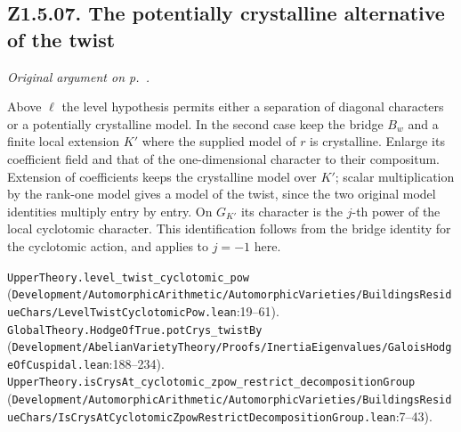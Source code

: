 \subsection{Z1.5.07. The potentially crystalline alternative of the twist}\label{r6:review:Z1.5.07} \emph{Original argument on p.~\pageref{r5:small:Z1.5.07}.} 

Above $\ell$ the level hypothesis permits either a separation of diagonal characters or a potentially crystalline model. In the second case keep the bridge $B_w$ and a finite local extension $K'$ where the supplied model of $r$ is crystalline. Enlarge its coefficient field and that of the one-dimensional character to their compositum. Extension of coefficients keeps the crystalline model over $K'$; scalar multiplication by the rank-one model gives a model of the twist, since the two original model identities multiply entry by entry. On $G_{K'}$ its character is the $j$-th power of the local cyclotomic character. This identification follows from the bridge identity for the cyclotomic action, and applies to $j=-1$ here.
\par{\footnotesize \nolinkurl{UpperTheory.level_twist_cyclotomic_pow} (\nolinkurl{Development/AutomorphicArithmetic/AutomorphicVarieties/BuildingsResidueChars/LevelTwistCyclotomicPow.lean}\allowbreak:19--61). \nolinkurl{GlobalTheory.HodgeOfTrue.potCrys_twistBy} (\nolinkurl{Development/AbelianVarietyTheory/Proofs/InertiaEigenvalues/GaloisHodgeOfCuspidal.lean}\allowbreak:188--234). \nolinkurl{UpperTheory.isCrysAt_cyclotomic_zpow_restrict_decompositionGroup} (\nolinkurl{Development/AutomorphicArithmetic/AutomorphicVarieties/BuildingsResidueChars/IsCrysAtCyclotomicZpowRestrictDecompositionGroup.lean}\allowbreak:7--43).\par}

